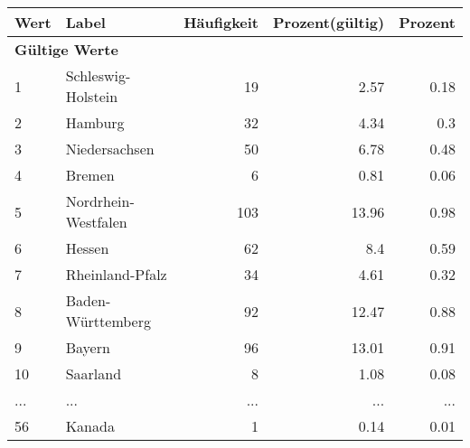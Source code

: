      \begin{longtable}{lXrrr}
     \toprule
     \textbf{Wert} & \textbf{Label} & \textbf{Häufigkeit} & \textbf{Prozent(gültig)} & \textbf{Prozent} \\
     \endhead
     \midrule
     \multicolumn{5}{l}{\textbf{Gültige Werte}}\\
        1 & \multicolumn{1}{X}{Schleswig-Holstein} & %
          \num{19} &
          \num[round-mode=places,round-precision=2]{2,57} &
          \num[round-mode=places,round-precision=2]{0,18} \\
        2 & \multicolumn{1}{X}{Hamburg} & %
          \num{32} &
          \num[round-mode=places,round-precision=2]{4,34} &
          \num[round-mode=places,round-precision=2]{0,3} \\
        3 & \multicolumn{1}{X}{Niedersachsen} & %
          \num{50} &
          \num[round-mode=places,round-precision=2]{6,78} &
          \num[round-mode=places,round-precision=2]{0,48} \\
        4 & \multicolumn{1}{X}{Bremen} & %
          \num{6} &
          \num[round-mode=places,round-precision=2]{0,81} &
          \num[round-mode=places,round-precision=2]{0,06} \\
        5 & \multicolumn{1}{X}{Nordrhein-Westfalen} & %
          \num{103} &
          \num[round-mode=places,round-precision=2]{13,96} &
          \num[round-mode=places,round-precision=2]{0,98} \\
        6 & \multicolumn{1}{X}{Hessen} & %
          \num{62} &
          \num[round-mode=places,round-precision=2]{8,4} &
          \num[round-mode=places,round-precision=2]{0,59} \\
        7 & \multicolumn{1}{X}{Rheinland-Pfalz} & %
          \num{34} &
          \num[round-mode=places,round-precision=2]{4,61} &
          \num[round-mode=places,round-precision=2]{0,32} \\
        8 & \multicolumn{1}{X}{Baden-Württemberg} & %
          \num{92} &
          \num[round-mode=places,round-precision=2]{12,47} &
          \num[round-mode=places,round-precision=2]{0,88} \\
        9 & \multicolumn{1}{X}{Bayern} & %
          \num{96} &
          \num[round-mode=places,round-precision=2]{13,01} &
          \num[round-mode=places,round-precision=2]{0,91} \\
        10 & \multicolumn{1}{X}{Saarland} & %
          \num{8} &
          \num[round-mode=places,round-precision=2]{1,08} &
          \num[round-mode=places,round-precision=2]{0,08} \\
       ... & ... & ... & ... & ... \\
        56 & \multicolumn{1}{X}{Kanada} & %
          \num{1} &
          \num[round-mode=places,round-precision=2]{0,14} &
          \num[round-mode=places,round-precision=2]{0,01} \\


\end{longtable}
